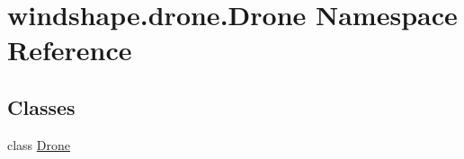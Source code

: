 \hypertarget{namespacewindshape_1_1drone_1_1_drone}{}\section{windshape.\+drone.\+Drone Namespace Reference}
\label{namespacewindshape_1_1drone_1_1_drone}
\subsection*{Classes}
\begin{DoxyCompactItemize}
\item 
class \mbox{\hyperlink{classwindshape_1_1drone_1_1_drone_1_1_drone}{Drone}}
\end{DoxyCompactItemize}
